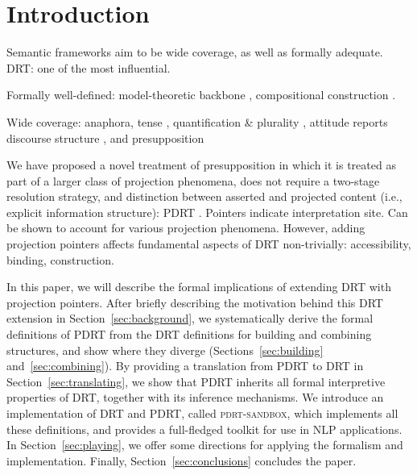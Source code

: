 \section{Introduction}

Semantic frameworks aim to be wide coverage, as well as formally adequate.
DRT: one of the most influential.

Formally well-defined: model-theoretic backbone
\cite{kamp1981theory,kamp1993discourse}, compositional construction
\cite{muskens1996combining}.

Wide coverage: anaphora, tense \cite{kamp1981theory}, quantification \&
plurality \cite{kamp1993discourse}, attitude reports
\cite{asher1986belief,asher1989belief,zeevat1996neoclassical,maier2009presupposing}
discourse structure \cite{asher2003logics}, and presupposition
\cite{sandt1992presupposition,kamp1994drs,krahmer1998presupposition,geurts1999presuppositions}

We have proposed a novel treatment of presupposition in which it is treated
as part of a larger class of projection phenomena, does not require
a two-stage resolution strategy, and distinction between asserted and
projected content (i.e., explicit information structure): PDRT
\cite{venhuizen2013iwcs}.  Pointers indicate interpretation site. Can be
shown to account for various projection phenomena.  However, adding
projection pointers affects fundamental aspects of DRT non-trivially:
accessibility, binding, construction. 

In this paper, we will describe the formal implications of extending DRT
with projection pointers. After briefly describing the motivation behind
this DRT extension in Section~\ref{sec:background}, we systematically
derive the formal definitions of PDRT from the DRT definitions for building
and combining structures, and show where they diverge
(Sections~\ref{sec:building} and~\ref{sec:combining}).  By providing
a translation from PDRT to DRT in Section~\ref{sec:translating}, we show
that PDRT inherits all formal interpretive properties of DRT, together with
its inference mechanisms.  We introduce an implementation of DRT and PDRT,
called \textsc{pdrt-sandbox}, which implements all these definitions, and
provides a full-fledged toolkit for use in NLP applications. In
Section~\ref{sec:playing}, we offer some directions for applying the
formalism and implementation. Finally, Section~\ref{sec:conclusions}
concludes the paper.






